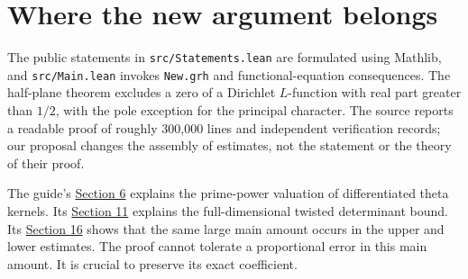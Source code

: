 \documentclass[11pt,letterpaper]{article}
\theoremstyle{remark}\newtheorem{remark}[theorem]{Remark}
\newcommand{\guide}[2]{\href{https://github.com/VladimirReshetnikov/ProveIt/blob/89d12dd40424f1217fd818d84877b3da52396a3b/Analysis/GeneralizedRiemannHypothesis/docs/guide/theta_lifts_and_dirichlet_zeros.tex\#L#1}{#2}}
\begin{document}
\setcounter{tocdepth}{1}
\makeatletter\renewcommand*{}\makeatother
\begingroup\small\setlength{\parskip}{0pt}\tableofcontents\endgroup
\newpage
\section{Where the new argument belongs}
The public statements in \texttt{src/Statements.lean} are formulated using Mathlib, and \texttt{src/Main.lean} invokes \texttt{New.grh} and functional-equation consequences. The half-plane theorem excludes a zero of a Dirichlet $L$-function with real part greater than $1/2$, with the pole exception for the principal character. The source reports a readable proof of roughly 300,000 lines and independent verification records; our proposal changes the assembly of estimates, not the statement or the theory of their proof.

The guide's \guide{532}{Section 6} explains the prime-power valuation of differentiated theta kernels. Its \guide{999}{Section 11} explains the full-dimensional twisted determinant bound. Its \guide{1554}{Section 16} shows that the same large main amount occurs in the upper and lower estimates. The proof cannot tolerate a proportional error in this main amount. It is crucial to preserve its exact coefficient.
\end{document}

